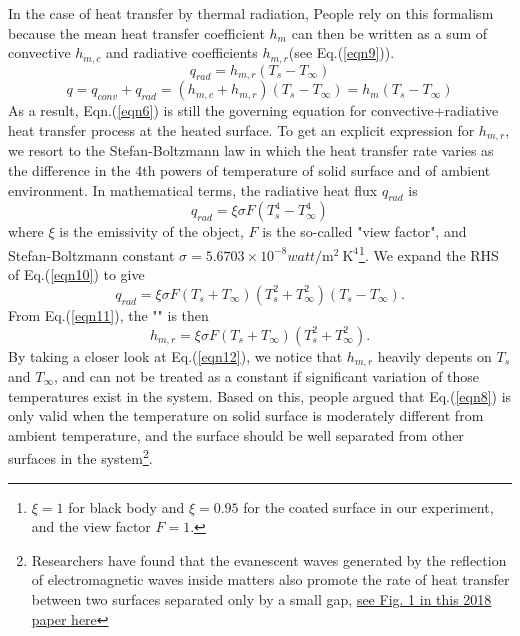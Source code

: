 In the case of heat transfer by thermal radiation,  People rely on this formalism because the mean heat transfer coefficient $h_m$ can then be written as a sum of convective $h_{m,c}$ and radiative coefficients $h_{m,r}$(see Eq.(\ref{eqn9})). 
\begin{equation}
    q_{rad}=h_{m,r}(T_s-T_{\infty})
    \label{eqn8}
\end{equation}
\begin{equation}
    q = q_{conv}+q_{rad}=(h_{m,c}+h_{m,r})(T_s-T_{\infty})=h_m(T_s-T_{\infty})
    \label{eqn9}
\end{equation}
As a result, Eqn.(\ref{eqn6}) is still the governing equation for convective+radiative heat transfer process at the heated surface. To get an explicit expression for $h_{m,r}$, we resort to the Stefan-Boltzmann law in which the heat transfer rate varies as the difference in the 4th powers of temperature of solid surface and of ambient environment. In mathematical terms, the radiative heat flux $q_{rad}$ is
\begin{equation}
q_{rad}=\xi \sigma F \left(T_s^{4}-T_{\infty}^{4}\right)
\label{eqn10}
\end{equation}
where $\xi$ is the emissivity of the object, $F$ is the so-called "view factor", and Stefan-Boltzmann constant $\sigma=5.6703 \times 10^{-8}watt/ \mathrm{m}^{2} \mathrm{~K}^{4}$\footnote{$\xi=1$ for black body and $\xi=0.95$ for the coated surface in our experiment, and the view factor $F = 1$.}. We expand the RHS of Eq.(\ref{eqn10}) to give
\begin{equation}
    q_{rad}=\xi\sigma F(T_s+T_{\infty})(T^2_s+T^2_{\infty})(T_s-T_{\infty}).
    \label{eqn11}
\end{equation}
From Eq.(\ref{eqn11}), the "" is then
\begin{equation}
    h_{m,r}=\xi\sigma F(T_s+T_{\infty})(T_s^2+T_{\infty}^2).
    \label{eqn12}
\end{equation}
By taking a closer look at Eq.(\ref{eqn12}), we notice that $h_{m,r}$ heavily depents on $T_s$ and $T_{\infty}$, and can not be treated as a constant if significant variation of those temperatures exist in the system. Based on this, people argued that Eq.(\ref{eqn8}) is only valid when the temperature on solid surface is moderately different from ambient temperature, and the surface should be well separated from other surfaces in the system\footnote{Researchers have found that the evanescent waves generated by the reflection of electromagnetic waves inside matters also promote the rate of heat transfer between two surfaces separated only by a small gap, \href{https://pubs.acs.org/doi/10.1021/acsphotonics.8b01031}{see Fig. 1 in this 2018 paper here}}.

